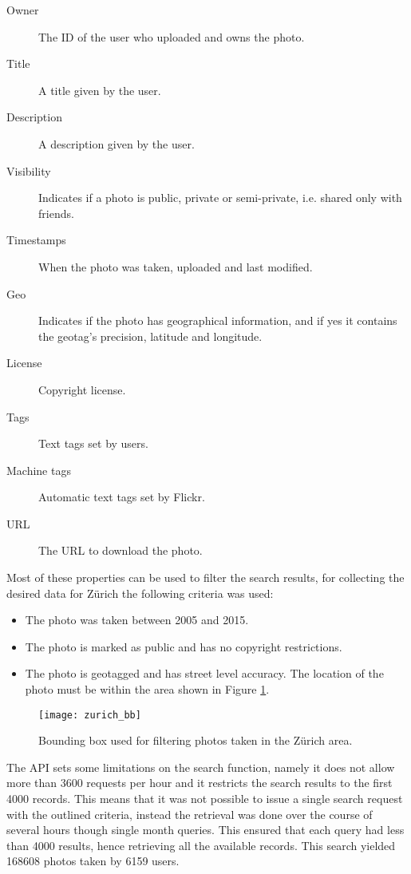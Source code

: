 \begin{description}
  \item[Owner] The ID of the user who uploaded and owns the photo.
  \item[Title] A title given by the user.
  \item[Description] A description given by the user.
  \item[Visibility] Indicates if a photo is public, private or semi-private, i.e. shared only with friends.
  \item[Timestamps] When the photo was taken, uploaded and last modified.
  \item[Geo] Indicates if the photo has geographical information, and if yes it contains the geotag's precision, latitude and longitude.
  \item[License] Copyright license.
  \item[Tags] Text tags set by users.
  \item[Machine tags] Automatic text tags set by Flickr.
  \item[URL] The URL to download the photo. 
\end{description}

Most of these properties can be used to filter the search results, for collecting the desired data for Zürich the following criteria was used:

\begin{itemize}
  \item The photo was taken between 2005 and 2015.
  \item The photo is marked as public and has no copyright restrictions.
  \item The photo is geotagged and has street level accuracy. The location of the photo must be within the area shown in Figure \ref{fig:zurich_bb}.
\end{itemize}

\begin{figure}
  \centering
  \texttt{[image: zurich\_bb]}
  \caption{Bounding box used for filtering photos taken in the Zürich area.}
  \label{fig:zurich_bb}
\end{figure}

The API sets some limitations on the search function, namely it does not allow more than 3600 requests per hour and it restricts the search results to the first 4000 records. This means that it was not possible to issue a single search request with the outlined criteria, instead the retrieval was done over the course of several hours though single month queries. This ensured that each query had less than 4000 results, hence retrieving all the available records. This search yielded 168608 photos taken by 6159 users.

